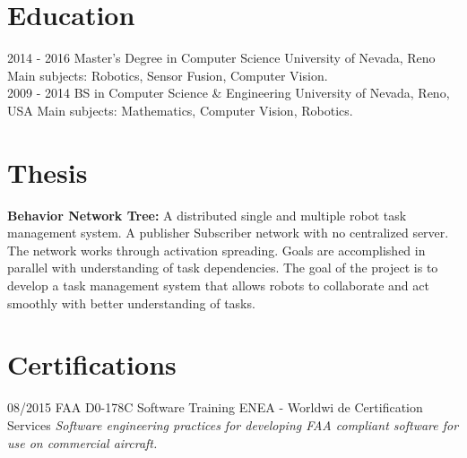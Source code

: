 \documentclass[]{friggeri-cv}
\begin{document}
\section{Education}
\begin{entrylist}
  \entry
    {2014 - 2016}
    {Master's Degree in Computer Science}
    {University of Nevada, Reno}
    {Main subjects: Robotics, Sensor Fusion, Computer Vision.\\}
  \entry
    {2009 - 2014}
    {BS in Computer Science \& Engineering}
    {University of Nevada, Reno, USA}
    {Main subjects: Mathematics, Computer Vision, Robotics.\\}
\end{entrylist}

\section{Thesis}
{\textbf{Behavior Network Tree:}}
{A distributed single and multiple robot task management system. A publisher Subscriber network with no centralized server. The network works through activation spreading. Goals are accomplished in parallel with understanding of task dependencies. The goal of the project is to develop a task management system that allows robots to collaborate and act smoothly with better understanding of tasks.}

\section{Certifications}
\begin{entrylist}
  \entry
    {08/2015}
    {FAA D0-178C Software Training}
    {ENEA - Worldwi de Certification Services}
    {\emph{Software engineering practices for developing FAA compliant software for use on commercial aircraft.}}
\end{entrylist}

\end{document}
